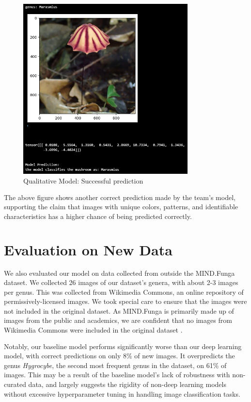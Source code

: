 \documentclass{article} %
\begin{document}
\FloatBarrier
\begin{figure}[h]
    \begin{center}
    \includegraphics[width=0.8\textwidth]{figures/qualitativeResultImg3.png}
    \end{center}
    \caption{Qualitative Model: Successful prediction}
    \label{fig:goodPrediction2}
\end{figure}
\FloatBarrier

The above figure shows another correct prediction made by the team’s model, supporting the claim that images with unique colors, patterns, and identifiable characteristics has a higher chance of being predicted correctly.

\section{Evaluation on New Data}
\label{sec:evaluation}
We also evaluated our model on data collected from outside the MIND.Funga dataset. We collected 26 images of our dataset's genera, with about 2-3 images per genus. This was collected from Wikimedia Commons, an online repository of permissively-licensed images. We took special care to ensure that the images were not included in the original dataset. As MIND.Funga is primarily made up of images from the public and academics, we are confident that no images from Wikimedia Commons were included in the original dataset \citep{Drechsler-SantosKarstedtEtAl.MINDFunga.2023}.

Notably, our baseline model performs significantly worse than our deep learning model, with correct predictions on only 8\% of new images. It overpredicts the genus \textit{Hygrocybe}, the second most frequent genus in the dataset, on 61\% of images. This may be a result of the baseline model's lack of robustness with non-curated data, and largely suggests the rigidity of non-deep learning models without excessive hyperparameter tuning in handling image classification tasks.
\end{document}
